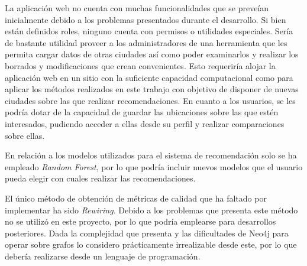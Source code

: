 La aplicación web no cuenta con muchas funcionalidades que se preveían inicialmente debido a los problemas presentados durante el desarrollo. Si bien están definidos roles, ninguno cuenta con permisos o utilidades especiales. Sería de bastante utilidad proveer a los administradores de una herramienta que les permita cargar datos de otras ciudades así como poder examinarlos y realizar los borrados y modificaciones que crean convenientes. Esto requeriría alojar la aplicación web en un sitio con la suficiente capacidad computacional como para aplicar los métodos realizados en este trabajo con objetivo de disponer de nuevas ciudades sobre las que realizar recomendaciones. En cuanto a los usuarios, se les podría dotar de la capacidad de guardar las ubicaciones sobre las que estén interesados, pudiendo acceder a ellas desde su perfil y realizar comparaciones sobre ellas.

En relación a los modelos utilizados para el sistema de recomendación solo se ha empleado \textit{Random Forest}, por lo que podría incluir nuevos modelos que el usuario pueda elegir con cuales realizar las recomendaciones.

El único método de obtención de métricas de calidad que ha faltado por implementar ha sido \textit{Rewiring}. Debido a los problemas que presenta este método no se utilizó en este proyecto, por lo que podría emplearse para desarrollos posteriores. Dada la complejidad que presenta y las dificultades de Neo4j para operar sobre grafos lo considero prácticamente irrealizable desde este, por lo que debería realizarse desde un lenguaje de programación.